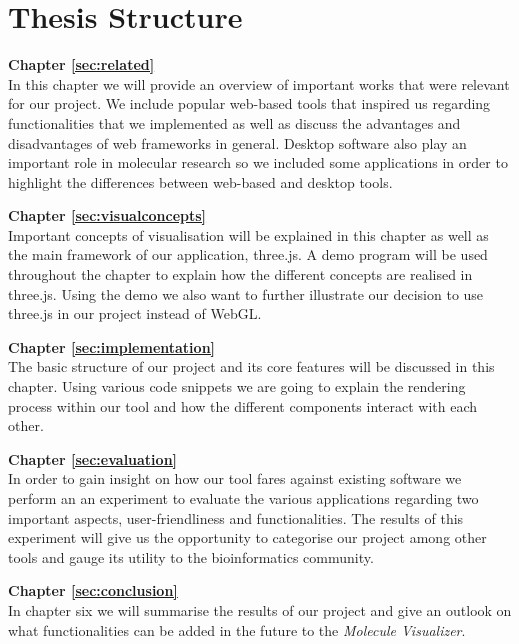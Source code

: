 \section{Thesis Structure}
\label{sec:intro:structure}

\textbf{Chapter \ref{sec:related}} \\[0.2em]
In this chapter we will provide an overview of important works that were relevant for our project. We include popular web-based tools that inspired us regarding functionalities that we implemented as well as discuss the advantages and disadvantages of web frameworks in general. Desktop software also play an important role in molecular research so we included some applications in order to highlight the differences between web-based and desktop tools.

\textbf{Chapter \ref{sec:visualconcepts}} \\[0.2em]
Important concepts of visualisation will be explained in this chapter as well as the main framework of our application, three.js. A demo program will be used throughout the chapter to explain how the different concepts are realised in three.js. Using the demo we also want to further illustrate our decision to use three.js in our project instead of WebGL.

\textbf{Chapter \ref{sec:implementation}} \\[0.2em]
The basic structure of our project and its core features will be discussed in this chapter. Using various code snippets we are going to explain the rendering process within our tool and how the different components interact with each other.

\textbf{Chapter \ref{sec:evaluation}} \\[0.2em]
In order to gain insight on how our tool fares against existing software we perform an an experiment to evaluate the various applications regarding two important aspects, user-friendliness and functionalities. The results of this experiment will give us the opportunity to categorise our project among other tools and gauge its utility to the bioinformatics community.

\textbf{Chapter \ref{sec:conclusion}} \\[0.2em]
In chapter six we will summarise the results of our project and give an outlook on what functionalities can be added in the future to the \textit{Molecule Visualizer}.
